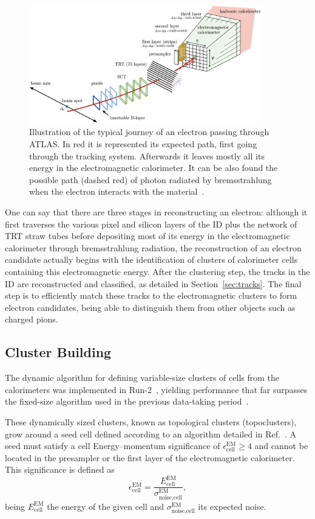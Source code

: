 \begin{figure}[htbp]
  \centering
  \includegraphics[width=0.9\textwidth]{images/electron_journey.png}
  \caption{Illustration of the typical journey of an electron passing through ATLAS. In red it is represented its expected path, first going through the tracking system. Afterwards it leaves mostly all its energy in the electromagnetic calorimeter. It can be also found the possible path (dashed red) of photon radiated by bremsstrahlung when the electron interacts with the material~\cite{Aaboud:2657964}.}
  \label{electron_journey}
\end{figure}
One can say that there are three stages in reconstructing an electron: although it first traverses the various pixel and silicon layers of the ID plus the network of TRT straw tubes before depositing most of its energy in the electromagnetic calorimeter through bremsstrahlung radiation, the reconstruction of an electron candidate actually begins with the identification of clusters of calorimeter cells containing this electromagnetic energy. After the clustering step, 
the tracks in the ID are reconstructed and classified, as detailed in Section~\ref{sec:tracks}. The final step is to efficiently match these tracks to the electromagnetic clusters to form electron candidates, being able to distinguish them from other objects such as charged pions.

\subsection{Cluster Building}

The dynamic algorithm for defining variable-size clusters of cells from the calorimeters was implemented in Run-2~\cite{dyn_clust}, yielding performance that far surpasses the fixed-size algorithm used in the previous data-taking period~\cite{fix_clust}.

These dynamically sized clusters, known as topological clusters (topoclusters), grow around a seed cell defined according to an algorithm detailed in Ref.~\cite{fix_clust}. A seed must satisfy a cell Energy–momentum significance of $\epsilon_{\text{cell}}^{\text{EM}} \geq 4$
and cannot be located in the presampler or the first layer of the electromagnetic calorimeter. This significance is defined as
\begin{equation}
  \epsilon_{\text{cell}}^{\text{EM}} = \frac{E_{\text{cell}}^{\text{EM}}}{\sigma^{\text{EM}}_{\text{noise,cell}}},
\end{equation}
being \(E_{\text{cell}}^{\text{EM}}\) the energy of the given cell and \(\sigma^{\text{EM}}_{\text{noise,cell}}\) its expected noise.

